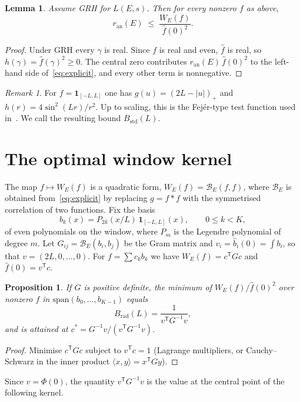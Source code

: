 \documentclass[11pt]{amsart}
\newtheorem{proposition}[theorem]{Proposition}
\newtheorem{lemma}[theorem]{Lemma}
\theoremstyle{remark}
\newtheorem{remark}[theorem]{Remark}
\theoremstyle{definition}
\newcommand{\ran}{r_{\mathrm{an}}}
\begin{document}
\begin{lemma}\label{lem:bound}
Assume GRH for $L(E,s)$. Then for every nonzero $f$ as above,
\[
\ran(E)\;\le\;\frac{W_E(f)}{\hat f(0)^2}.
\]
\end{lemma}
\begin{proof}
Under GRH every $\gamma$ is real. Since $f$ is real and even, $\hat f$ is real, so $h(\gamma)=\hat f(\gamma)^2\ge0$. The central zero contributes $\ran(E)\,\hat f(0)^2$ to the left-hand side of~\eqref{eq:explicit}, and every other term is nonnegative.
\end{proof}

\begin{remark}
For $f=\mathbf 1_{[-L,L]}$ one has $g(u)=(2L-|u|)_+$ and $h(r)=4\sin^2(Lr)/r^2$. Up to scaling, this is the Fej\'er-type test function used in~\cite{Bober,KSW}. We call the resulting bound $B_{\mathrm{std}}(L)$.
\end{remark}

\section{The optimal window kernel}

The map $f\mapsto W_E(f)$ is a quadratic form, $W_E(f)=\mathcal B_E(f,f)$, where $\mathcal B_E$ is obtained from~\eqref{eq:explicit} by replacing $g=f*f$ with the symmetrised correlation of two functions. Fix the basis
\[
b_k(x)=P_{2k}(x/L)\,\mathbf 1_{[-L,L]}(x),\qquad 0\le k<K,
\]
of even polynomials on the window, where $P_m$ is the Legendre polynomial of degree $m$. Let $G_{ij}=\mathcal B_E(b_i,b_j)$ be the Gram matrix and $v_i=\hat b_i(0)=\int b_i$, so that $v=(2L,0,\dots,0)$. For $f=\sum c_k b_k$ we have $W_E(f)=c^{\mathsf T}Gc$ and $\hat f(0)=v^{\mathsf T}c$.

\begin{proposition}\label{prop:opt}
If $G$ is positive definite, the minimum of $W_E(f)/\hat f(0)^2$ over nonzero $f$ in $\mathrm{span}(b_0,\dots,b_{K-1})$ equals
\[
B_{\mathrm{rad}}(L)=\frac{1}{v^{\mathsf T}G^{-1}v},
\]
and is attained at $c^\ast=G^{-1}v/(v^{\mathsf T}G^{-1}v)$.
\end{proposition}
\begin{proof}
Minimise $c^{\mathsf T}Gc$ subject to $v^{\mathsf T}c=1$ (Lagrange multipliers, or Cauchy--Schwarz in the inner product $\langle x,y\rangle=x^{\mathsf T}Gy$).
\end{proof}

Since $v=\Phi(0)$, the quantity $v^{\mathsf T}G^{-1}v$ is the value at the central point of the following kernel.
\end{document}
